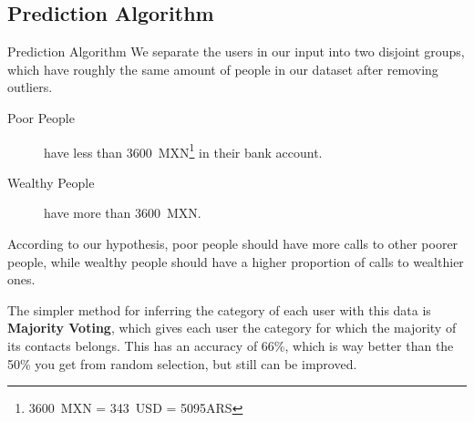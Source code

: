 \documentclass{beamer}
\begin{document}
\subsection{Prediction Algorithm}
\begin{frame}{Prediction Algorithm}
	We separate the users in our input into two disjoint groups, which have roughly the same amount of people in our dataset after removing outliers.

	\begin{description}
		\item[Poor People] have less than \num{3600}~MXN\footnote{3600~MXN = 343~USD = \num{5095}ARS} in their bank account.
		\item[Wealthy People] have more than \num{3600}~MXN.\@
	\end{description}

	According to our hypothesis, poor people should have more calls to other poorer people, while wealthy people should have a higher proportion of calls to wealthier ones.
\end{frame}

\begin{frame}
	The simpler method for inferring the category of each user with this data is \textbf{Majority Voting}, which gives each user the category for which the majority of its contacts belongs. This has an accuracy of 66\%, which is way better than the 50\% you get from random selection, but still can be improved.
\end{frame}
\end{document}
